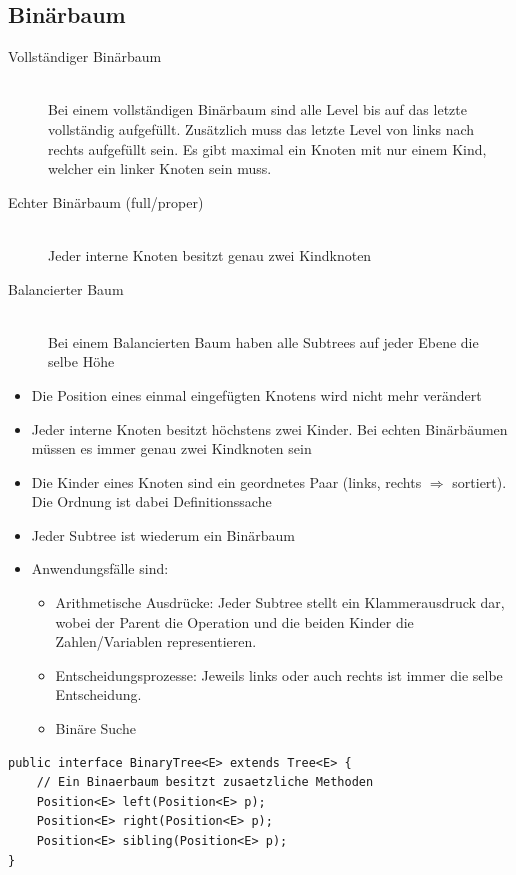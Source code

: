\subsection{Binärbaum}
\begin{description}
	\item[Vollständiger Binärbaum] \hfill \\
	Bei einem vollständigen Binärbaum sind alle Level bis auf das letzte vollständig aufgefüllt. Zusätzlich muss das letzte Level von links nach rechts aufgefüllt sein. Es gibt maximal ein Knoten mit nur einem Kind, welcher ein linker Knoten sein muss.
	\item[Echter Binärbaum (full/proper)] \hfill \\
	Jeder interne Knoten besitzt genau zwei Kindknoten
	\item[Balancierter Baum] \hfill \\ 
	Bei einem Balancierten Baum haben alle Subtrees auf jeder Ebene die selbe Höhe
\end{description}
\begin{itemize}
	\item Die Position eines einmal eingefügten Knotens wird nicht mehr verändert
	\item Jeder interne Knoten besitzt höchstens zwei Kinder. Bei echten Binärbäumen müssen es immer genau zwei Kindknoten sein
	\item Die Kinder eines Knoten sind ein geordnetes Paar (links, rechts $\Rightarrow$ sortiert). Die Ordnung ist dabei Definitionssache
	\item Jeder Subtree ist wiederum ein Binärbaum
	\item Anwendungsfälle sind:
	\begin{itemize}
		\item Arithmetische Ausdrücke: Jeder Subtree stellt ein Klammerausdruck dar, wobei der Parent die Operation und die beiden Kinder die Zahlen/Variablen representieren.
		\item Entscheidungsprozesse: Jeweils links oder auch rechts ist immer die selbe Entscheidung.
		\item Binäre Suche
	\end{itemize}
\end{itemize}
\begin{lstlisting}
public interface BinaryTree<E> extends Tree<E> {
	// Ein Binaerbaum besitzt zusaetzliche Methoden
	Position<E> left(Position<E> p);
	Position<E> right(Position<E> p);
	Position<E> sibling(Position<E> p);
}
\end{lstlisting}


